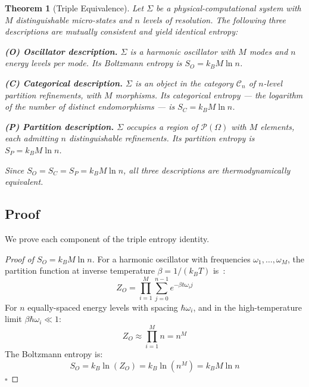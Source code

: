 \documentclass[12pt,twocolumn]{article}
\newtheorem{theorem}{Theorem}[section]
\begin{document}
\begin{theorem}[Triple Equivalence]
\label{thm:triple}
Let $\Sigma$ be a physical-computational system with $M$ distinguishable micro-states and $n$ levels of resolution. The following three descriptions are mutually consistent and yield identical entropy:

\medskip
\noindent\textbf{(O) Oscillator description.} $\Sigma$ is a harmonic oscillator with $M$ modes and $n$ energy levels per mode. Its Boltzmann entropy is $S_O = k_B M \ln n$.

\medskip
\noindent\textbf{(C) Categorical description.} $\Sigma$ is an object in the category $\mathcal{C}_n$ of $n$-level partition refinements, with $M$ morphisms. Its categorical entropy --- the logarithm of the number of distinct endomorphisms --- is $S_C = k_B M \ln n$.

\medskip
\noindent\textbf{(P) Partition description.} $\Sigma$ occupies a region of $\mathcal{P}(\Omega)$ with $M$ elements, each admitting $n$ distinguishable refinements. Its partition entropy is $S_P = k_B M \ln n$.

\medskip
Since $S_O = S_C = S_P = k_B M \ln n$, all three descriptions are thermodynamically equivalent.
\end{theorem}

\subsection{Proof}

We prove each component of the triple entropy identity.

\begin{proof}[Proof of $S_O = k_B M \ln n$]
For a harmonic oscillator with frequencies $\omega_1, \ldots, \omega_M$, the partition function at inverse temperature $\beta = 1/(k_B T)$ is~\cite{landau1980statistical}:
\begin{equation}
Z_O = \prod_{i=1}^M \sum_{j=0}^{n-1} e^{-\beta \hbar \omega_i j}
\end{equation}
For $n$ equally-spaced energy levels with spacing $\hbar\omega_i$, and in the high-temperature limit $\beta\hbar\omega_i \ll 1$:
\begin{equation}
Z_O \approx \prod_{i=1}^M n = n^M
\end{equation}
The Boltzmann entropy is:
\begin{equation}
S_O = k_B \ln(Z_O) = k_B \ln(n^M) = k_B M \ln n
\end{equation}
$\square$
\end{proof}
\end{document}
